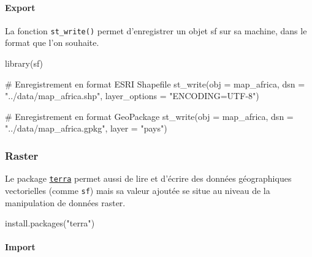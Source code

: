 \documentclass[
  letterpaper,
  DIV=11,
  numbers=noendperiod]{scrartcl}
\let\oldparagraph\paragraph
\renewcommand{\paragraph}[1]{\oldparagraph{#1}\mbox{}}
\newenvironment{Shaded}{\begin{snugshade}}{\end{snugshade}}
\newcommand{\AttributeTok}[1]{\textcolor[rgb]{0.40,0.45,0.13}{#1}}
\newcommand{\CommentTok}[1]{\textcolor[rgb]{0.37,0.37,0.37}{#1}}
\newcommand{\FunctionTok}[1]{\textcolor[rgb]{0.28,0.35,0.67}{#1}}
\newcommand{\NormalTok}[1]{\textcolor[rgb]{0.00,0.23,0.31}{#1}}
\newcommand{\StringTok}[1]{\textcolor[rgb]{0.13,0.47,0.30}{#1}}
\begin{document}
\hypertarget{export-2}{%
\paragraph{Export}\label{export-2}}

La fonction \texttt{st\_write()} permet d'enregistrer un objet sf sur sa
machine, dans le format que l'on souhaite.

\begin{Shaded}
\begin{Highlighting}[]
\FunctionTok{library}\NormalTok{(sf)}

\CommentTok{\# Enregistrement en format ESRI Shapefile}
\FunctionTok{st\_write}\NormalTok{(}\AttributeTok{obj =}\NormalTok{ map\_africa, }
         \AttributeTok{dsn =} \StringTok{"../data/map\_africa.shp"}\NormalTok{, }
         \AttributeTok{layer\_options =} \StringTok{"ENCODING=UTF{-}8"}\NormalTok{)}


\CommentTok{\# Enregistrement en format GeoPackage}
\FunctionTok{st\_write}\NormalTok{(}\AttributeTok{obj =}\NormalTok{ map\_africa, }
         \AttributeTok{dsn =} \StringTok{"../data/map\_africa.gpkg"}\NormalTok{, }
         \AttributeTok{layer =} \StringTok{"pays"}\NormalTok{)}
\end{Highlighting}
\end{Shaded}

\hfill\break

\hypertarget{raster}{%
\subsubsection{Raster}\label{raster}}

Le package \href{https://rspatial.org/index.html}{\texttt{terra}} permet
aussi de lire et d'écrire des données géographiques vectorielles (comme
\texttt{sf}) mais sa valeur ajoutée se situe au niveau de la
manipulation de données raster.

\begin{Shaded}
\begin{Highlighting}[]
\FunctionTok{install.packages}\NormalTok{(}\StringTok{"terra"}\NormalTok{)}
\end{Highlighting}
\end{Shaded}

\hypertarget{import-3}{%
\paragraph{Import}\label{import-3}}
\end{document}
